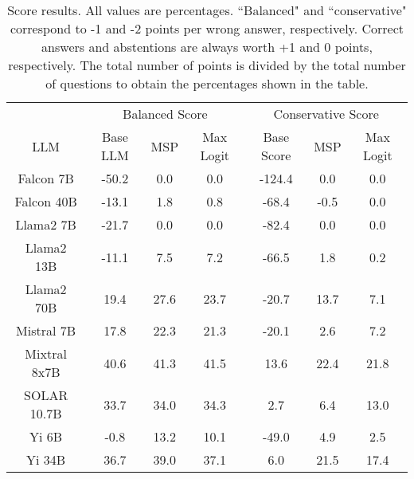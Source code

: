 \renewcommand\arraystretch{1.2}
\begin{table*}
\centering
\begin{tabular}{c|c|c|c|c|c|c}
& \multicolumn{3}{c|}{Balanced Score} & \multicolumn{3}{c}{Conservative Score} \\ 
LLM & Base LLM & MSP & Max Logit & Base Score & MSP & Max Logit\\ \hline
Falcon 7B & -50.2 & 0.0 & 0.0 & -124.4 & 0.0 & 0.0\\
Falcon 40B & -13.1 & 1.8 & 0.8 & -68.4 & -0.5 & 0.0\\
Llama2 7B & -21.7 & 0.0 & 0.0 & -82.4 & 0.0 & 0.0\\
Llama2 13B & -11.1 & 7.5 & 7.2 & -66.5 & 1.8 & 0.2\\
Llama2 70B & 19.4 & 27.6 & 23.7 & -20.7 & 13.7 & 7.1\\
Mistral 7B & 17.8 & 22.3 & 21.3 & -20.1 & 2.6 & 7.2\\
Mixtral 8x7B & 40.6 & 41.3 & 41.5 & 13.6 & 22.4 & 21.8\\
SOLAR 10.7B & 33.7 & 34.0 & 34.3 & 2.7 & 6.4 & 13.0\\
Yi 6B & -0.8 & 13.2 & 10.1 & -49.0 & 4.9 & 2.5\\
Yi 34B & 36.7 & 39.0 & 37.1 & 6.0 & 21.5 & 17.4\\
\hline
\end{tabular}
\caption{Score results. All values are percentages. ``Balanced" and ``conservative" correspond to -1 and -2 points per wrong answer, respectively. Correct answers and abstentions are always worth +1 and 0 points, respectively. The total number of points is divided by the total number of questions to obtain the percentages shown in the table.}
\label{tab:score}
\end{table*}
